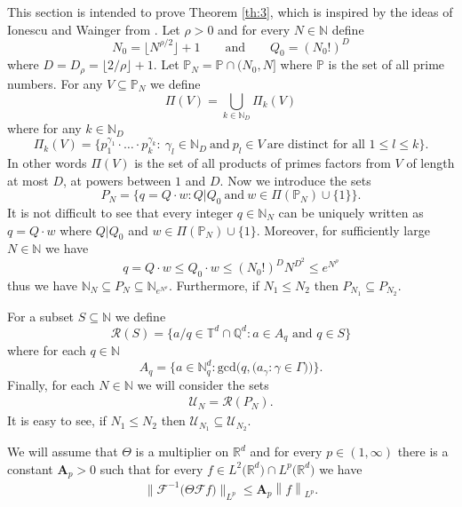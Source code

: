 \documentclass[a4paper,oneside]{amsart}
\theoremstyle{plain}
\theoremstyle{definition}
\numberwithin{equation}{section}
\theoremstyle{plain}
\newcommand{\RR}{\mathbb{R}}
\newcommand{\TT}{\mathbb{T}}
\newcommand{\NN}{\mathbb{N}}
\newcommand{\QQ}{\mathbb{Q}}
\newcommand{\boldA}{\mathbf{A}}
\newcommand{\calF}{\mathcal{F}}
\newcommand{\vnorm}[1]{{\left\lVert {#1} \right\rVert}}
\newcommand{\8}{\infty}
\begin{document}
This section is intended to prove Theorem \ref{th:3}, which
is inspired by  the ideas of Ionescu and Wainger from
\cite{iw}.  Let $\rho>0$ and  for every $N\in\NN$ define
\[
N_0=\lfloor
N^{\rho/2}\rfloor+1 \qquad \text{and} \qquad Q_0=(N_0!)^D
\]
where
$D=D_{\rho}=\lfloor 2/\rho\rfloor+1$. Let  $\mathbb P_N=\mathbb P\cap
(N_0, N]$ where $\mathbb P$ is the set
of all prime numbers. For any
$V\subseteq\mathbb P_N$ we define
\[
\Pi(V)=\bigcup_{k\in\NN_D}\Pi_k(V)
\]
where for any $k\in\NN_D$
\[
\Pi_k(V)=\big\{p_{1}^{\gamma_{1}}\cdot\ldots\cdot
p_{k}^{\gamma_{k}}: \ \gamma_{l}\in\NN_D\  \text{and}\ p_{l}\in
V\ \text{are distinct for all $1\le l\le k$} \big\}.
\]
In other words $\Pi(V)$ is the set of all products of primes factors from $V$ of
length at most $D$, at powers between $1$ and $D$. Now we introduce
the sets
\[
 P_N=\big\{q=Q\cdot w: Q|Q_0\ \text{and}\ w\in
\Pi(\mathbb P_{N})\cup\{1\}\big\}.
\]
It is not difficult
to see  that every integer $q\in\NN_N$ can be uniquely
written as $q=Q\cdot w$ where $Q|Q_0$ and $w\in \Pi(\mathbb
P_N)\cup\{1\}$.  Moreover, for sufficiently large $N\in\NN$ we have 
\[q=Q\cdot w\le Q_0\cdot w\le (N_0!)^DN^{D^2}\le
e^{N^{\rho}}
\]
thus  
we have 
$\NN_N\subseteq P_N\subseteq\NN_{e^{N^{\rho}}}$. Furthermore, if
$N_1\le N_2$ then  $P_{N_1}\subseteq P_{N_2}$.

For a subset $S\subseteq\NN$ we define 
\[
\mathcal R(S)=\big\{a/q \in \TT^d\cap\QQ^d : a \in A_q \text{ and }
q\in S\big\}
\] 
where for each $q\in\NN$ 
\[
A_q=\big\{a\in\NN_q^d: \mathrm{gcd}\big(q, \mathrm(a_{\gamma}: \gamma\in\Gamma)\big)\big\}.
\]
Finally, for each $N\in\NN$ we will consider the sets
\begin{align}
  \label{eq:156}
\mathscr{U}_N=\mathcal R(P_N).
\end{align}
It is easy to see, if $N_1\le N_2$ then  $\mathscr{U}_{N_1}\subseteq \mathscr{U}_{N_2}$.




 We will assume that $\Theta$ is a multiplier on $\RR^d$ and
for every $p\in(1, \infty)$ there is a constant $\boldA_p >0 $ such that for every
$f\in L^2\big(\RR^d\big)\cap L^p\big(\RR^d\big)$ we have
\begin{align}
  \label{eq:155}
  \big\lVert\calF^{-1}\big(\Theta\mathcal F f\big)\big\rVert_{L^p}
  \leq
  \boldA_p \vnorm{f}_{L^p}.
\end{align}
\end{document}
